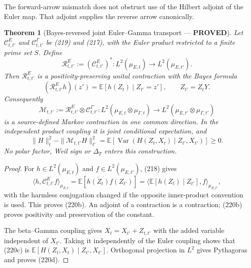 \documentclass[11pt]{article}
\newtheorem{theorem}{Theorem}
\newcommand{\PROVED}{\textcolor{green!45!black}{\textbf{PROVED}}}
\begin{document}
The forward-arrow mismatch does not obstruct use of the Hilbert adjoint of
the Euler map.  That adjoint supplies the reverse arrow canonically.

\begin{theorem}[Bayes-reversed joint Euler--Gamma transport --- \PROVED]
Let $\mathcal C^E_{t,t'}$ and $\mathcal C^\Gamma_{t,t'}$ be (219) and
(217), with the Euler product restricted to a finite prime set $S$.  Define
\begin{equation}
 \mathcal R^E_{t,t'}:=(\mathcal C^E_{t,t'})^*:
 L^2(\mu_{E,t})\longrightarrow L^2(\mu_{E,t'}).      \tag{220a}
\end{equation}
Then $\mathcal R^E_{t,t'}$ is a positivity-preserving unital contraction
with the Bayes formula
\begin{equation}
 (\mathcal R^E_{t,t'}h)(z')
   =\mathbb E[h(Z_t)\mid Z_{t'}=z'],
 \qquad Z_{t'}=Z_tY.                                 \tag{220b}
\end{equation}
Consequently
\begin{equation}
 \boxed{\mathcal M_{t,t'}:=
 \mathcal R^E_{t,t'}\otimes\mathcal C^\Gamma_{t,t'}:
 L^2(\mu_{E,t}\otimes\mu_{\Gamma,t})\to
 L^2(\mu_{E,t'}\otimes\mu_{\Gamma,t'})}            \tag{220c}
\end{equation}
is a source-defined Markov contraction in one common direction.  In the
independent product coupling it is joint conditional expectation, and
\begin{equation}
 \|H\|_t^2-\|\mathcal M_{t,t'}H\|_{t'}^2
 =\mathbb E\!\left[
    \operatorname{Var}(H(Z_t,X_t)\mid Z_{t'},X_{t'})
   \right]\ge0.                                     \tag{220d}
\end{equation}
No polar factor, Weil sign or $\Delta_T$ enters this construction.
\end{theorem}

\begin{proof}
For $h\in L^2(\mu_{E,t})$ and $f\in L^2(\mu_{E,t'})$, (218) gives
\[
 \langle h,\mathcal C^E_{t,t'}f\rangle_{\mu_{E,t}}
 =\mathbb E[\overline{h(Z_t)}f(Z_{t'})]
 =\langle\mathbb E[h(Z_t)\mid Z_{t'}],f\rangle_{\mu_{E,t'}},
\]
with the harmless conjugation changed if the opposite inner-product
convention is used.  This proves (220b).  An adjoint of a contraction is a
contraction; (220b) proves positivity and preservation of the constant.

The beta--Gamma coupling gives $X_t=X_{t'}+Z_{t,t'}$ with the added variable
independent of $X_{t'}$.  Taking it independently of the Euler coupling
shows that (220c) is
$\mathbb E[H(Z_t,X_t)\mid Z_{t'},X_{t'}]$.  Orthogonal projection in
$L^2$ gives Pythagoras and proves (220d).
\end{proof}
\end{document}

